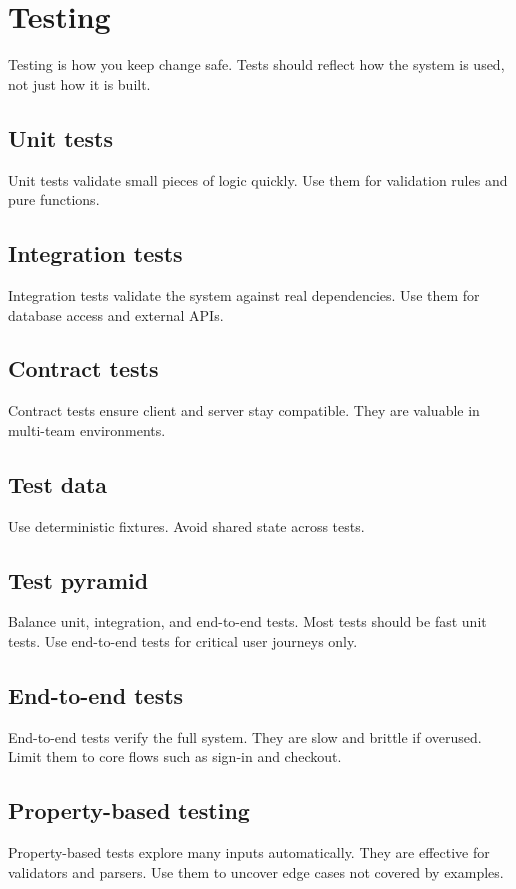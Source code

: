 \chapter{Testing}

Testing is how you keep change safe.
Tests should reflect how the system is used, not just how it is built.

\section{Unit tests}
Unit tests validate small pieces of logic quickly.
Use them for validation rules and pure functions.

\section{Integration tests}
Integration tests validate the system against real dependencies.
Use them for database access and external APIs.

\section{Contract tests}
Contract tests ensure client and server stay compatible.
They are valuable in multi-team environments.

\section{Test data}
Use deterministic fixtures.
Avoid shared state across tests.

\section{Test pyramid}
Balance unit, integration, and end-to-end tests.
Most tests should be fast unit tests.
Use end-to-end tests for critical user journeys only.

\section{End-to-end tests}
End-to-end tests verify the full system.
They are slow and brittle if overused.
Limit them to core flows such as sign-in and checkout.

\section{Property-based testing}
Property-based tests explore many inputs automatically.
They are effective for validators and parsers.
Use them to uncover edge cases not covered by examples.

